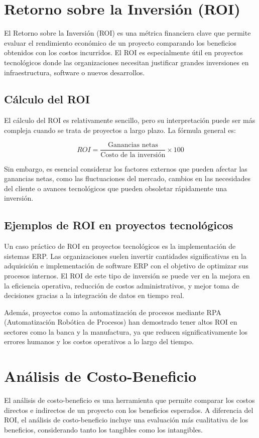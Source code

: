 \documentclass[12pt]{article}
\begin{document}
\section{Retorno sobre la Inversión (ROI)}
El Retorno sobre la Inversión (ROI) es una métrica financiera clave que permite evaluar el rendimiento económico de un proyecto comparando los beneficios obtenidos con los costos incurridos. El ROI es especialmente útil en proyectos tecnológicos donde las organizaciones necesitan justificar grandes inversiones en infraestructura, software o nuevos desarrollos.

\subsection{Cálculo del ROI}
El cálculo del ROI es relativamente sencillo, pero su interpretación puede ser más compleja cuando se trata de proyectos a largo plazo. La fórmula general es:

\[
ROI = \frac{\text{Ganancias netas}}{\text{Costo de la inversión}} \times 100
\]

Sin embargo, es esencial considerar los factores externos que pueden afectar las ganancias netas, como las fluctuaciones del mercado, cambios en las necesidades del cliente o avances tecnológicos que pueden obsoletar rápidamente una inversión.

\subsection{Ejemplos de ROI en proyectos tecnológicos}
Un caso práctico de ROI en proyectos tecnológicos es la implementación de sistemas ERP. Las organizaciones suelen invertir cantidades significativas en la adquisición e implementación de software ERP con el objetivo de optimizar sus procesos internos. El ROI de este tipo de inversión se puede ver en la mejora en la eficiencia operativa, reducción de costos administrativos, y mejor toma de decisiones gracias a la integración de datos en tiempo real.

Además, proyectos como la automatización de procesos mediante RPA (Automatización Robótica de Procesos) han demostrado tener altos ROI en sectores como la banca y la manufactura, ya que reducen significativamente los errores humanos y los costos operativos a lo largo del tiempo.

\section{Análisis de Costo-Beneficio}
El análisis de costo-beneficio es una herramienta que permite comparar los costos directos e indirectos de un proyecto con los beneficios esperados. A diferencia del ROI, el análisis de costo-beneficio incluye una evaluación más cualitativa de los beneficios, considerando tanto los tangibles como los intangibles.
\end{document}

